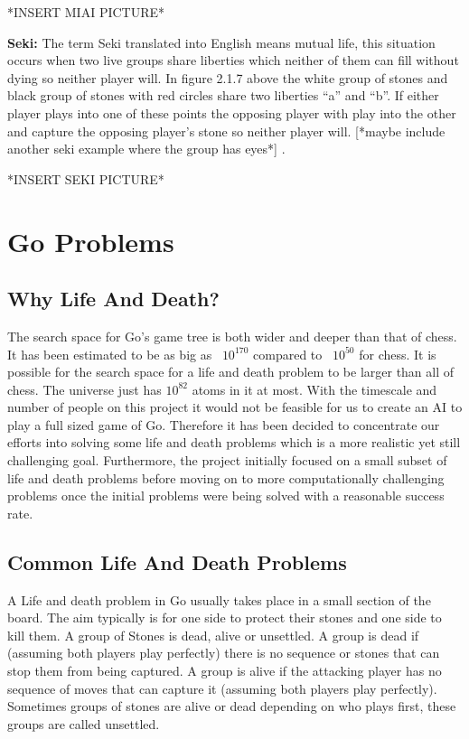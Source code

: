 \documentclass{l3proj}
\begin{document}
*INSERT MIAI PICTURE*

\textbf{Seki:} The term Seki translated into English means mutual life, this situation occurs when two live groups share liberties which neither of them can fill without dying so neither player will.
 In figure 2.1.7 above the white group of stones and black group of stones with red circles share two liberties “a” and “b”. If either player plays into one of these points the opposing player with play into the other and capture the opposing player’s stone so neither player will. [*maybe include another seki example where the group has eyes*] .

*INSERT SEKI PICTURE*

\section{Go Problems}

\subsection{Why Life And Death?}

The search space for Go's game tree is both wider and deeper than that of chess. It has been estimated to be as big as ~$10^{170}$ compared to ~$10^{50}$ for chess. It is possible for the search space for a life and death problem to be larger than all of chess. The universe just has $10^{82}$ atoms in it at most. With the timescale and number of people on this project it would not be feasible for us to create an AI to play a full sized game of Go. Therefore it has been decided to concentrate our efforts into solving some life and death problems which is a more realistic yet still challenging goal. Furthermore, the project initially focused on a small subset of life and death problems before moving on to more computationally challenging problems once the initial problems were being solved with a reasonable success rate.

\subsection{Common Life And Death Problems}

A Life and death problem in Go usually takes place in a small section of the board. The aim typically is for one side to protect their stones and one side to kill them. A group of Stones is dead, alive or unsettled. A group is dead if (assuming both players play perfectly) there is no sequence or stones that can stop them from being captured. A group is alive if the attacking player has no sequence of moves that can capture it (assuming both players play perfectly). Sometimes groups of stones are alive or dead depending on who plays first, these groups are called unsettled.
\end{document}
